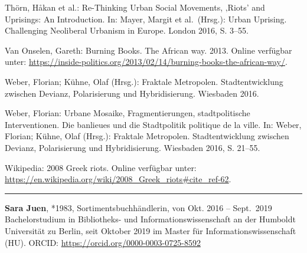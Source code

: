 \documentclass[a4paper,
fontsize=11pt,
oneside,
numbers=noperiodatend,
parskip=half-,
bibliography=totoc,
final
]{scrartcl}
\begin{document}
Thörn, Håkan et al.: Re-Thinking Urban Social Movements, ‚Riots' and
Uprisings: An Introduction. In: Mayer, Margit et al.~(Hrsg.): Urban
Uprising. Challenging Neoliberal Urbanism in Europe. London 2016, S.
3--55.

Van Onselen, Gareth: Burning Books. The African way. 2013. Online
verfügbar unter: \newline
\url{https://inside-politics.org/2013/02/14/burning-books-the-african-way/}.

Weber, Florian; Kühne, Olaf (Hrsg.): Fraktale Metropolen.
Stadtentwicklung zwischen Devianz, Polarisierung und Hybridisierung.
Wiesbaden 2016.

Weber, Florian: Urbane Mosaike, Fragmentierungen, stadtpolitische
Interventionen. Die banlieues und die Stadtpolitik politique de la
ville. In: Weber, Florian; Kühne, Olaf (Hrsg.): Fraktale Metropolen.
Stadtentwicklung zwischen Devianz, Polarisierung und Hybridisierung.
Wiesbaden 2016, S. 21--55.

Wikipedia: 2008 Greek riots. Online verfügbar unter:
\url{https://en.wikipedia.org/wiki/2008_Greek_riots\#cite_ref-62}.

\begin{center}\rule{0.5\linewidth}{0.5pt}\end{center}

\textbf{Sara Juen}, *1983, Sortimentsbuchhändlerin, von Okt. 2016 --
Sept.~2019 Bachelorstudium in Bibliotheks- und Informationswissenschaft
an der Humboldt Universität zu Berlin, seit Oktober 2019 im Master für
Informationswissenschaft (HU). ORCID:
\url{https://orcid.org/0000-0003-0725-8592}
\end{document}
